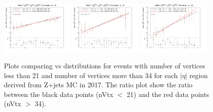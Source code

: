 \begin{figure}[h!]
    \centering
    \includegraphics[width=0.32\textwidth]{images_geofit/nVtx_eta_0_0p9_2017.png}
    \includegraphics[width=0.32\textwidth]{images_geofit/nVtx_eta_0p9_1p7_2017.png}
    \includegraphics[width=0.32\textwidth]{images_geofit/nVtx_eta_1p7_inf_2017.png}
    \caption{Plots comparing \dptoverptsquare vs \dzeroBS distributions for events with number of vertices less than 21 and number of vertices more than 34 for each $|\eta|$ region derived from Z+jets MC in 2017. The ratio plot show the ratio between the black data points (nVtx $<$ 21) and the red data points (nVtx $>$ 34).}
    \label{fig:nVtx_d0_2017}
\end{figure}

